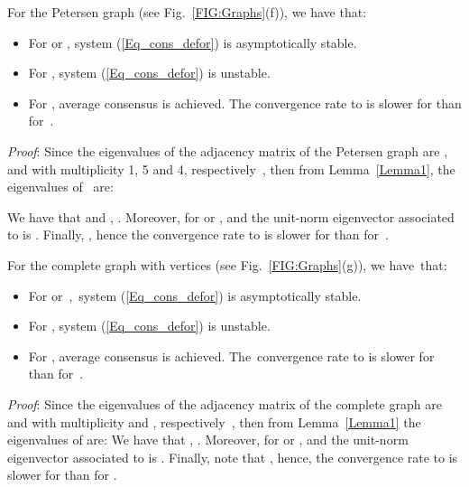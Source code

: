 \documentclass[letterpaper,9pt,twocolumn]{autart}
\begin{document}
\begin{proposition}
For the Petersen graph (see Fig.~\ref{FIG:Graphs}(f)), we have that:
\begin{itemize}
\item For  or , system (\ref{Eq_cons_defor}) is asymptotically stable.
\item For , system (\ref{Eq_cons_defor}) is unstable.
\item For , average consensus is achieved. The convergence rate
to  is slower for  than for~.\vspace{-0.12cm}
\end{itemize}
\emph{Proof}:
Since the eigenvalues of the adjacency matrix of the Petersen graph
are ,  and  with multiplicity 1, 5 and 4, respectively~\cite[Sect.~1.4.5]{BrouwerHa_book12}, 
then from Lemma~\ref{Lemma1}, the eigenvalues of~ are:

We have that  and , . Moreover,
 for  or , and the unit-norm eigenvector associated
to  is .
\mbox{Finally}, , 
hence the convergence rate to 
is slower for  than for~.
\hfill
\end{proposition}

\begin{proposition}
For the complete graph  with  vertices (see Fig.~\ref{FIG:Graphs}(g)), we have~that:
\begin{itemize}
\item For  or \,,\, system (\ref{Eq_cons_defor}) is asymptotically stable.
\item For , system (\ref{Eq_cons_defor}) is unstable.
\item For , average consensus is achieved.
The~convergence rate to 
is slower for  than for~.
\end{itemize}
\emph{Proof}:
Since the eigenvalues of the adjacency matrix of the complete graph
are  and  with multiplicity  and , respectively~\cite[Sect.~1.4.1]{BrouwerHa_book12}, 
then from Lemma~\ref{Lemma1} the eigenvalues of
 are: 
We have that , . Moreover,
 for  or , and the unit-norm eigenvector associated
to  is .
Finally, note that ,
hence, the convergence rate to  is slower for
 than for .
\hfill
\end{proposition}
\end{document}
